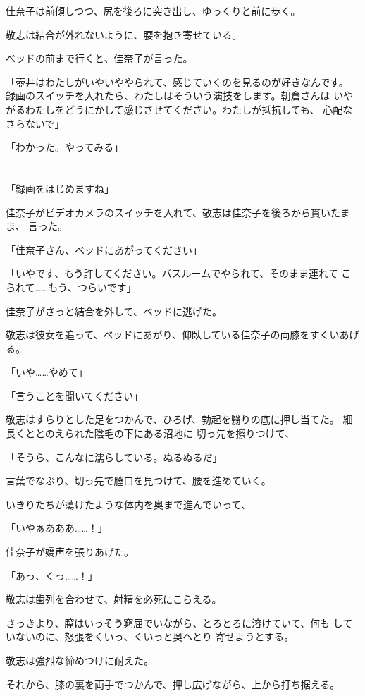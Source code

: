﻿\documentclass[
    book,tate,
    line_length=30zw,
    jafontsize=12pt,
    paper=b5j,
    landscape,
    ]{jlreq}
\begin{document}
佳奈子は前傾しつつ、尻を後ろに突き出し、ゆっくりと前に歩く。

敬志は結合が外れないように、腰を抱き寄せている。

ベッドの前まで行くと、佳奈子が言った。

「壺井はわたしがいやいややられて、感じていくのを見るのが好きなんです。
録画のスイッチを入れたら、わたしはそういう演技をします。朝倉さんは
いやがるわたしをどうにかして感じさせてください。わたしが抵抗しても、
心配なさらないで」

「わかった。やってみる」

\section*{}

「録画をはじめますね」

佳奈子がビデオカメラのスイッチを入れて、敬志は佳奈子を後ろから貫いたまま、
言った。

「佳奈子さん、ベッドにあがってください」

「いやです、もう許してください。バスルームでやられて、そのまま連れて
こられて……もう、つらいです」

佳奈子がさっと結合を外して、ベッドに逃げた。

敬志は彼女を追って、ベッドにあがり、仰臥している佳奈子の両膝をすくいあげる。

「いや……やめて」

「言うことを聞いてください」

敬志はすらりとした足をつかんで、ひろげ、勃起を翳りの底に押し当てた。
細長くととのえられた陰毛の下にある沼地に 切っ先を擦りつけて、

「そうら、こんなに濡らしている。ぬるぬるだ」

言葉でなぶり、切っ先で膣口を見つけて、腰を進めていく。

いきりたちが蕩けたような体内を奥まで進んでいって、

「いやぁあああ……！」

佳奈子が嬌声を張りあげた。

「あっ、くっ……！」

敬志は歯列を合わせて、射精を必死にこらえる。

さっきより、膣はいっそう窮屈でいながら、とろとろに溶けていて、何も
していないのに、怒張をくいっ、くいっと奥へとり
寄せようとする。

敬志は強烈な締めつけに耐えた。

それから、膝の裏を両手でつかんで、押し広げながら、上から打ち据える。
\end{document}
